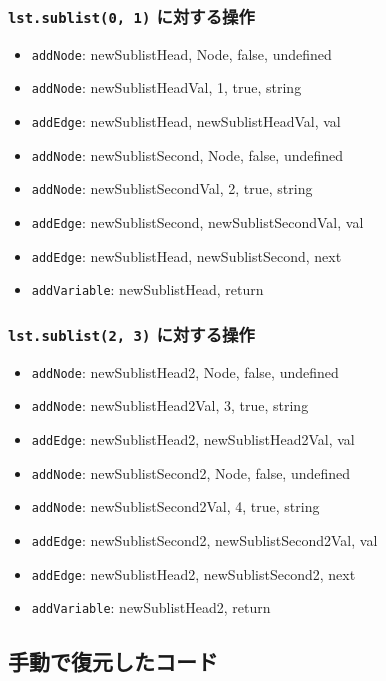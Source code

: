 \documentclass{article}
\begin{document}
\subsubsection{\texttt{lst.sublist(0, 1)} に対する操作}
\begin{itemize}
  \item \texttt{addNode}: newSublistHead, Node, false, undefined
  \item \texttt{addNode}: newSublistHeadVal, 1, true, string
  \item \texttt{addEdge}: newSublistHead, newSublistHeadVal, val
  \item \texttt{addNode}: newSublistSecond, Node, false, undefined
  \item \texttt{addNode}: newSublistSecondVal, 2, true, string
  \item \texttt{addEdge}: newSublistSecond, newSublistSecondVal, val
  \item \texttt{addEdge}: newSublistHead, newSublistSecond, next
  \item \texttt{addVariable}: newSublistHead, return
\end{itemize}

\subsubsection{\texttt{lst.sublist(2, 3)} に対する操作}
\begin{itemize}
  \item \texttt{addNode}: newSublistHead2, Node, false, undefined
  \item \texttt{addNode}: newSublistHead2Val, 3, true, string
  \item \texttt{addEdge}: newSublistHead2, newSublistHead2Val, val
  \item \texttt{addNode}: newSublistSecond2, Node, false, undefined
  \item \texttt{addNode}: newSublistSecond2Val, 4, true, string
  \item \texttt{addEdge}: newSublistSecond2, newSublistSecond2Val, val
  \item \texttt{addEdge}: newSublistHead2, newSublistSecond2, next
  \item \texttt{addVariable}: newSublistHead2, return
\end{itemize}

\subsection{手動で復元したコード}
\end{document}
